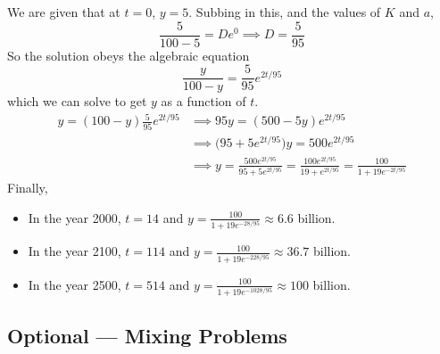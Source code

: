 \begin{eg}
We are given that at $t=0$, $y=5$. Subbing in this, and the values of $K$
and $a$,
\begin{equation*}
\frac{5}{100-5}=De^{0}
\implies D=\frac{5}{95}
\end{equation*}
So the solution obeys the algebraic equation
\begin{equation*}
 \frac{y}{100-y}=\frac{5}{95}e^{2t/95}
\end{equation*}
which we can solve to get $y$ as a function of $t$.
\begin{align*}
 y=(100-y)\frac{5}{95}e^{2t/95}
     &\implies 95y=(500-5y)e^{2t/95} \\
     &\implies \big(95+5e^{2t/95}\big)y=500 e^{2t/95} \\
     &\implies y=\frac{500e^{2t/95}}{95+5e^{2t/95}}
=\frac{100e^{2t/95}}{19+e^{2t/95}}
=\frac{100}{1+19e^{-2t/95}}
\end{align*}
Finally,
\begin{itemize}\itemsep1pt \parskip0pt  %
\item  In the year 2000, $t=14$ and
                 $y=\frac{100}{1+19e^{-28/95}}\approx6.6$ billion.
\item  In the year 2100, $t=114$ and
                $y=\frac{100}{1+19e^{-228/95}}\approx 36.7$ billion.
\item  In the year 2500, $t=514$ and
                $y=\frac{100}{1+19e^{-1028/95}}\approx 100$ billion.
\end{itemize}
\end{eg}



\subsection{Optional --- Mixing Problems}

